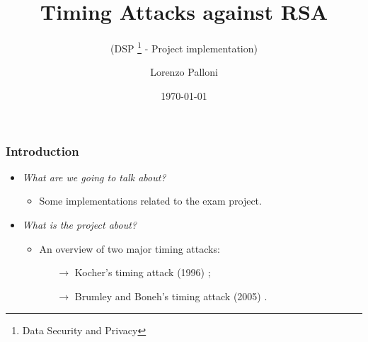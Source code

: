 \documentclass{beamer}
\title[DSP - 2021/22 - Lorenzo Palloni]{Timing Attacks against RSA}
\subtitle{(DSP \footnote{Data Security and Privacy} - Project implementation)}
\author{Lorenzo Palloni}
\institute[]{
  University of Florence\\
  \medskip
  \textit{lorenzo.palloni@stud.unifi.it}
}
\date{\today}
\begin{document}
\begin{frame}
\titlepage %
\end{frame}

%
\begin{frame}
\frametitle{Introduction}

\begin{itemize}

  \item \emph{What are we going to talk about?}
  \begin{itemize}
    \item Some implementations related to the exam project.
  \end{itemize}
  \item \emph{What is the project about?}
  \begin{itemize}
    \item An overview of two major timing attacks:
    \begin{itemize}
      \item[$\rightarrow$] Kocher's timing attack (1996) \cite{bib:kocher};
      \item[$\rightarrow$] Brumley and Boneh's timing attack (2005) \cite{bib:openssl}.
    \end{itemize}
  \end{itemize}
\end{itemize}

\end{frame}
\end{document}
